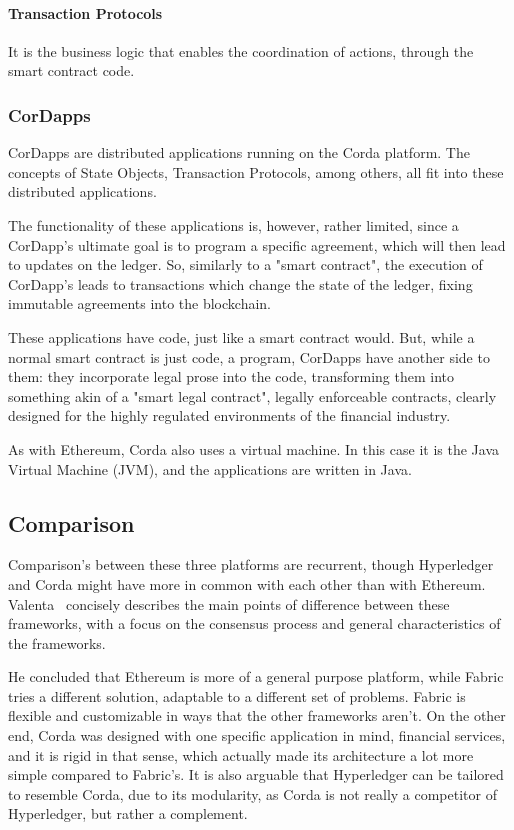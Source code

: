 \paragraph{Transaction Protocols} It is the business logic that enables the coordination of actions, through the smart contract code.


\subsubsection{CorDapps}
CorDapps are distributed applications running on the Corda platform. The concepts of State Objects, Transaction Protocols, among others, all fit into these distributed applications.

The functionality of these applications is, however, rather limited, since a CorDapp's ultimate goal is to program a specific agreement, which will then lead to updates on the ledger. So, similarly to a "smart contract", the execution of CorDapp's leads to transactions which change the state of the ledger, fixing immutable agreements into the blockchain.

These applications have code, just like a smart contract would. But, while a normal smart contract is just code, a program, CorDapps have another side to them: they incorporate legal prose into the code, transforming them into something akin of a "smart legal contract", legally enforceable contracts, clearly designed for the highly regulated environments of the financial industry.

As with Ethereum, Corda also uses a virtual machine. In this case it is the Java Virtual Machine (JVM), and the applications are written in Java.


\subsection{Comparison}
Comparison's between these three platforms are recurrent, though Hyperledger and Corda might have more in common with each other than with Ethereum. 
Valenta~\cite{Valenta2017} concisely describes the main points of difference between these frameworks, with a focus on the consensus process and general characteristics of the frameworks. 

He concluded that Ethereum is more of a general purpose platform, while Fabric tries a different solution, adaptable to a different set of problems. Fabric is flexible and customizable in ways that the other frameworks aren't. On the other end, Corda  was designed with one specific application in mind, financial services, and it is rigid in that sense, which actually made its architecture a lot more simple compared to Fabric's. It is also arguable that Hyperledger can be tailored to resemble Corda, due to its modularity, as Corda is not really a competitor of Hyperledger, but rather a complement. 

